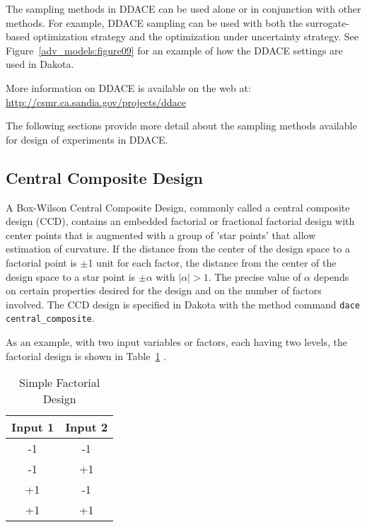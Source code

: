 The sampling methods in DDACE can be used alone or in conjunction with
other methods. For example, DDACE sampling can be used with both the
surrogate-based optimization strategy and the optimization under
uncertainty strategy. See Figure~\ref{adv_models:figure09} for an
example of how the DDACE settings are used in Dakota.

More information on DDACE is available on the web at:
\url{http://csmr.ca.sandia.gov/projects/ddace}

The following sections provide more detail about the sampling 
methods available for design of experiments in DDACE. 

\subsection{Central Composite Design}\label{dace:ccd}

A Box-Wilson Central Composite Design, commonly called a central
composite design (CCD), contains an embedded factorial or fractional
factorial design with center points that is augmented with a group of
'star points' that allow estimation of curvature.  If the distance
from the center of the design space to a factorial point is $\pm$1
unit for each factor, the distance from the center of the design space
to a star point is $\pm\alpha$ with $\mid\alpha\mid > 1$. The precise
value of $\alpha$ depends on certain properties desired for the design and on
the number of factors involved.  The CCD design is specified in Dakota
with the method command \texttt{dace central\_composite}.

As an example, with two input variables or factors, each having two 
levels, the factorial design is shown in Table~\ref{dace:table01} . 

\begin{table}[ht]
 \caption{Simple Factorial Design}
 \label{dace:table01}	
 \begin{center}
  \begin{tabular}{c|c}
  \hline
  Input 1            & Input 2         \\ \hline \hline 
  -1                 & -1             \\ \hline 
  -1                 & +1           \\ \hline
  +1                 & -1      \\ \hline
  +1                 & +1        \\ \hline
  \end{tabular}
\end{center}
\end{table}


